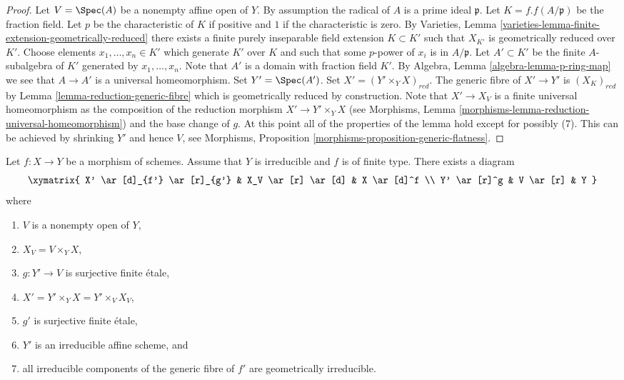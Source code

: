 \begin{proof}
Let $V = \Spec(A)$ be a nonempty affine open of $Y$.
By assumption the radical of $A$ is a prime ideal $\mathfrak p$.
Let $K = f.f(A/\mathfrak p)$ be the fraction field.
Let $p$ be the characteristic of $K$ if positive and $1$
if the characteristic is zero. By
Varieties, Lemma \ref{varieties-lemma-finite-extension-geometrically-reduced}
there exists a finite purely inseparable field extension
$K \subset K'$ such that $X_{K'}$ is geometrically reduced over $K'$.
Choose elements $x_1, \ldots, x_n \in K'$ which generate $K'$ over
$K$ and such that some $p$-power of $x_i$ is in $A/\mathfrak p$.
Let $A' \subset K'$ be the finite $A$-subalgebra of $K'$ generated by
$x_1, \ldots, x_n$. Note that $A'$ is a domain with fraction field $K'$. By
Algebra, Lemma \ref{algebra-lemma-p-ring-map}
we see that $A \to A'$ is a universal homeomorphism.
Set $Y' = \Spec(A')$. Set $X' = (Y' \times_Y X)_{red}$.
The generic fibre of $X' \to Y'$ is $(X_K)_{red}$ by
Lemma \ref{lemma-reduction-generic-fibre}
which is geometrically reduced by construction.
Note that $X' \to X_V$ is a finite universal homeomorphism as the
composition of the reduction morphism $X' \to Y' \times_Y X$ (see
Morphisms, Lemma \ref{morphisms-lemma-reduction-universal-homeomorphism})
and the base change of $g$.
At this point all of the properties of the lemma hold except for
possibly (7). This can be achieved by shrinking $Y'$ and hence $V$, see
Morphisms, Proposition \ref{morphisms-proposition-generic-flatness}.
\end{proof}

\begin{lemma}
\label{lemma-make-components-generic-fibre-geometrically-irreducible}
Let $f : X \to Y$ be a morphism of schemes.
Assume that $Y$ is irreducible and $f$ is of finite type.
There exists a diagram
$$
\xymatrix{
X' \ar[d]_{f'} \ar[r]_{g'} & X_V \ar[r] \ar[d] & X \ar[d]^f \\
Y' \ar[r]^g & V \ar[r] & Y
}
$$
where
\begin{enumerate}
\item $V$ is a nonempty open of $Y$,
\item $X_V = V \times_Y X$,
\item $g : Y' \to V$ is surjective finite \'etale,
\item $X' = Y' \times_Y X = Y' \times_V X_V$,
\item $g'$ is surjective finite \'etale,
\item $Y'$ is an irreducible affine scheme, and
\item all irreducible components of the generic fibre of $f'$
are geometrically irreducible.
\end{enumerate}
\end{lemma}

